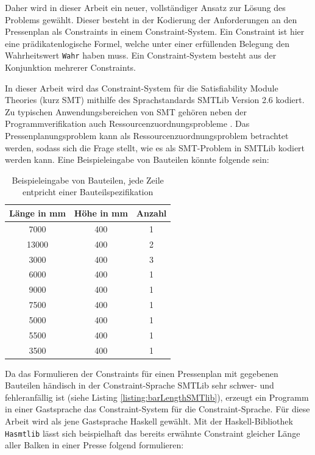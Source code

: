 Daher wird in dieser Arbeit ein neuer, vollständiger Ansatz zur Lösung des Problems gewählt.
Dieser besteht in der Kodierung der Anforderungen an den Pressenplan als Constraints in einem Constraint-System.
Ein \gls{Constraint} ist hier eine prädikatenlogische Formel, welche unter einer erfüllenden Belegung den Wahrheitswert \texttt{Wahr} haben muss.
Ein \gls{Constraint-System} besteht aus der Konjunktion mehrerer Constraints.

In dieser Arbeit wird das Constraint-System für die Satisfiability Module Theories (kurz SMT) mithilfe des Sprachstandards \gls{SMTLib} Version 2.6 \cite{smtlib} kodiert.
Zu typischen Anwendungsbereichen von SMT gehören neben der Programmverifikation \cite{smt} auch Ressourcenzuordnungsprobleme \cite{rcpsp,smartnocs}.
Das Pressenplanungsproblem kann als Ressourcenzuordnungsproblem betrachtet werden, sodass sich die Frage stellt, wie es als SMT-Problem in SMTLib kodiert werden kann.
Eine Beispieleingabe von Bauteilen könnte folgende sein:

\begin{table}[H]
    \centering
    \begin{tabular}{|c|c|c|}
        \hline
        \textbf{Länge in mm} & \textbf{Höhe in mm} & \textbf{Anzahl} \\
        \hline
        7000 & 400 & 1 \\
        13000 & 400 & 2 \\
        3000 & 400 & 3 \\
        6000 & 400 & 1 \\
        9000 & 400 & 1 \\
        7500 & 400 & 1 \\
        5000 & 400 & 1 \\
        5500 & 400 & 1 \\
        3500 & 400 & 1 \\
        \hline
    \end{tabular}
    \caption{Beispieleingabe von Bauteilen, jede Zeile entpricht einer Bauteilspezifikation}
    \label{table:bauteileingabe}
\end{table}

Da das Formulieren der Constraints für einen Pressenplan mit gegebenen Bauteilen händisch in der Constraint-Sprache SMTLib sehr schwer- und fehleranfällig ist
(siehe Listing \ref{listing:barLengthSMTlib}), erzeugt ein Programm in einer Gastsprache das Constraint-System für die Constraint-Sprache.
Für diese Arbeit wird als jene Gastsprache Haskell \cite{haskellhistory} gewählt.
Mit der Haskell-Bibliothek \texttt{Hasmtlib} \cite{hasmtlib} lässt sich beispielhaft das bereits erwähnte Constraint
gleicher Länge aller Balken in einer Presse folgend formulieren:

